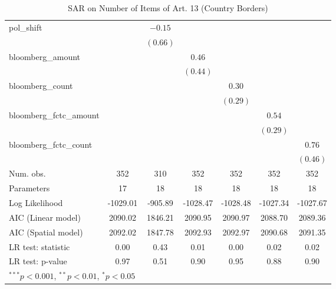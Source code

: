 \begin{table}[!h]
\begin{center}
\begin{tabular}{l c c c c c c }
pol\_shift              &              & $-0.15$      &              &              &              &              \\
                        &              & $(0.66)$     &              &              &              &              \\
bloomberg\_amount       &              &              & $0.46$       &              &              &              \\
                        &              &              & $(0.44)$     &              &              &              \\
bloomberg\_count        &              &              &              & $0.30$       &              &              \\
                        &              &              &              & $(0.29)$     &              &              \\
bloomberg\_fctc\_amount &              &              &              &              & $0.54$       &              \\
                        &              &              &              &              & $(0.29)$     &              \\
bloomberg\_fctc\_count  &              &              &              &              &              & $0.76$       \\
                        &              &              &              &              &              & $(0.46)$     \\
\midrule
Num. obs.               & 352          & 310          & 352          & 352          & 352          & 352          \\
Parameters              & 17           & 18           & 18           & 18           & 18           & 18           \\
Log Likelihood          & -1029.01     & -905.89      & -1028.47     & -1028.48     & -1027.34     & -1027.67     \\
AIC (Linear model)      & 2090.02      & 1846.21      & 2090.95      & 2090.97      & 2088.70      & 2089.36      \\
AIC (Spatial model)     & 2092.02      & 1847.78      & 2092.93      & 2092.97      & 2090.68      & 2091.35      \\
LR test: statistic      & 0.00         & 0.43         & 0.01         & 0.00         & 0.02         & 0.02         \\
LR test: p-value        & 0.97         & 0.51         & 0.90         & 0.95         & 0.88         & 0.90         \\
\bottomrule
\multicolumn{7}{l}{\scriptsize{$^{***}p<0.001$, $^{**}p<0.01$, $^*p<0.05$}}
\end{tabular}
\caption{SAR on Number of Items of Art. 13 (Country Borders)}
\label{table:coefficients}
\end{center}
\end{table}
